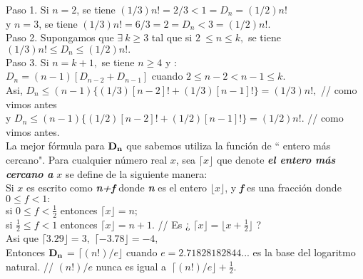 \documentclass{article}
\begin{document}
Paso 1. Si $n = 2$, se tiene $(1/3)n! = 2/3 < 1 = D_{n} = (1/2)n!$\\
\hspace*{0.5cm} y \hspace{1,2cm} $n = 3$, se tiene $(1/3)n! = 6/3 = 2 = D_{n}<3 = (1/2)n!.$\\

Paso 2. Supongamos que $\exists ~k \geq 3$ tal que si $2 ~\leq n \leq k,$ se tiene $(1/3)n! \leq D_{n} \leq (1/2)n!.$\\

Paso 3. Si $n = k+1,$ se tiene $n \geq 4$ y :\\
\hspace*{1,9cm} $D_{n} = (n-1)[D_{n-2} + D_{n-1}]$ cuando $2 \leq n-2 <n-1 \leq k.$\\

Asi, \hspace*{0.50cm} $D_{n} \leq (n-1)\{(1/3)[n-2]! + (1/3)[n-1]!\} = (1/3)n!,$ // como vimos antes\\

y \hspace{1,0cm} $D_{n} \leq (n-1)\{(1/2)[n-2]! + (1/2)[n-1]!\} = (1/2)n!.$ // como vimos antes.\\

La mejor fórmula para $\bf{D_{n}}$ que sabemos utiliza la función de `` entero más cercano". Para cualquier número real $x$, sea $\lceil x \rfloor$ que denote \textit{\textbf{el entero más cercano a}} $x$ se define de la siguiente manera: \\
Si $x$ es escrito como \textit{\textbf{n+f}} donde \textit{\textbf{n}} es el entero $\lfloor x \rfloor$, y \textit{\textbf{f}} es una fracción donde $0 \leq f < 1 :$\\

si $0 \leq f < \frac{1}{2}$ \hspace{2cm} entonces $\lceil x \rfloor = n;$\\

si $\frac{1}{2} \leq f < 1$ \hspace{2cm} entonces $\lceil x \rfloor = n+1.$ // Es ¿ $\lceil x \rfloor = \lfloor x + \frac{1}{2} \rfloor$ ? \\

Asi que $\lceil 3.29 \rfloor = 3,$ \hspace{0.8cm}  $\lceil -3.78 \rfloor = -4,$\\

Entonces $\bf{D_{n}}$ = $\lceil(n!)/e\rfloor$ cuando $e = 2.71828182844...$ es la base del logaritmo natural.  // $(n!)/e$  nunca es igual a $~\lceil(n!)/e\rfloor + \frac{1}{2}.$
\end{document}
